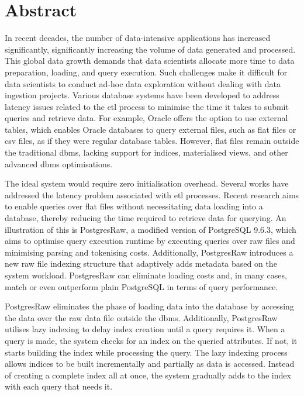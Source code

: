 
\thispagestyle{plain}

\section*{Abstract}
In recent decades, the number of data-intensive applications has increased significantly, significantly increasing the volume of data generated and processed. This global data growth demands that data scientists allocate more time to data preparation, loading, and query execution. Such challenges make it difficult for data scientists to conduct ad-hoc data exploration without dealing with data ingestion projects. Various database systems have been developed to address latency issues related to the \acrfull{etl} process to minimise the time it takes to submit queries and retrieve data. For example, Oracle offers the option to use external tables, which enables Oracle databases to query external files, such as flat 
files or \acrfull{csv} files, as if they were regular database tables. However, flat files remain outside the traditional \acrfull{dbms}, lacking support for indices, materialised views, and other advanced \acrshort{dbms} optimisations.

The ideal system would require zero initialisation overhead. Several works have addressed the latency problem associated with 
\acrshort{etl} processes. Recent research aims to enable queries over flat files without necessitating data loading into a database, thereby reducing the time required to retrieve data for querying. An illustration of this is PostgresRaw, a modified version of PostgreSQL 9.6.3, which aims to optimise query execution runtime by executing queries over raw files and minimising parsing and tokenising costs. Additionally, PostgresRaw introduces a new raw file indexing structure that adaptively adds metadata based on the system workload. PostgresRaw can eliminate loading costs and, in many cases, match or even outperform plain PostgreSQL in terms of query performance.

PostgresRaw eliminates the phase of loading data into the database by accessing the data over the raw data file outside the \acrshort{dbms}. Additionally, PostgresRaw utilises lazy indexing to delay index creation until a query requires it. When a query is made, the system checks for an index on the queried attributes. If not, it starts building the index while processing the query. The lazy indexing process allows indices to be built incrementally and partially as data is accessed. Instead of creating a complete index all at once, the system gradually adds to the index with each query that needs it.

